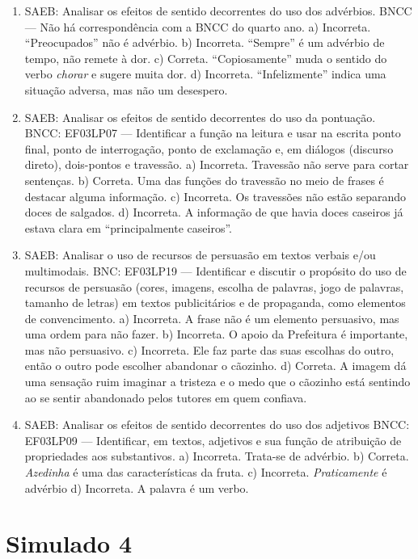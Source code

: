\begin{enumerate}
\item
SAEB: Analisar os efeitos de sentido decorrentes do uso dos advérbios. BNCC --- Não há correspondência com a BNCC do quarto ano. a) Incorreta. ``Preocupados'' não é advérbio. b) Incorreta. ``Sempre'' é um advérbio de tempo, não remete à dor. c) Correta. ``Copiosamente'' muda o sentido do verbo \emph{chorar} e sugere muita dor. d) Incorreta. ``Infelizmente'' indica uma situação adversa, mas não um desespero.

\item
SAEB: Analisar os efeitos de sentido decorrentes do uso da pontuação. BNCC: EF03LP07 --- Identificar a função na leitura e usar na escrita ponto final, ponto de interrogação, ponto de exclamação e, em diálogos (discurso direto), dois-pontos e travessão. a) Incorreta. Travessão não serve para cortar sentenças. b) Correta. Uma das funções do travessão no meio de frases é destacar alguma informação. c) Incorreta. Os travessões não estão separando doces de salgados. d) Incorreta. A informação de que havia doces caseiros já estava clara em ``principalmente caseiros''.

\item
SAEB: Analisar o uso de recursos de persuasão em textos verbais e/ou multimodais. BNC: EF03LP19 --- Identificar e discutir o propósito do uso de recursos de persuasão (cores, imagens, escolha de palavras, jogo de palavras, tamanho de letras) em textos publicitários e de propaganda, como elementos de convencimento. a) Incorreta. A frase não é um elemento persuasivo, mas uma ordem para não fazer. b) Incorreta. O apoio da Prefeitura é importante, mas não persuasivo. c) Incorreta. Ele faz parte das suas escolhas do outro, então o outro pode escolher abandonar o cãozinho. d) Correta. A imagem dá uma sensação ruim imaginar a tristeza e o medo que o cãozinho está sentindo ao se sentir abandonado pelos tutores em quem confiava.

\item
SAEB: Analisar os efeitos de sentido decorrentes do uso dos adjetivos BNCC: EF03LP09 --- Identificar, em textos, adjetivos e sua função de atribuição de propriedades aos substantivos. a) Incorreta. Trata-se de advérbio. b) Correta. \emph{Azedinha} é uma das características da fruta. c) Incorreta. \emph{Praticamente} é advérbio d) Incorreta. A palavra é um verbo.
\end{enumerate}

\section*{Simulado 4}

